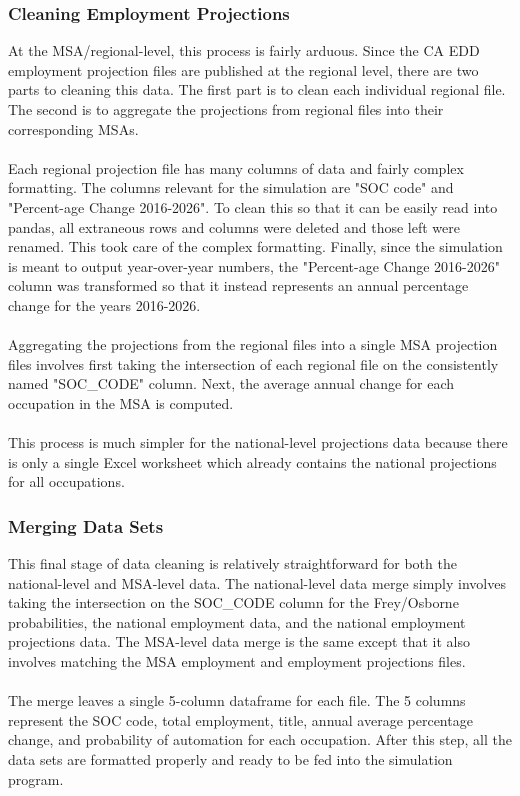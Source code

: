 \documentclass[10pt]{article}
\begin{document}
\subsubsection{Cleaning Employment Projections}
At the MSA/regional-level, this process is fairly arduous. Since the CA EDD employment projection files are published at the regional level, there are two parts to cleaning this data. The first part is to clean each individual regional file. The second is to aggregate the projections from regional files into their corresponding MSAs.\\\\ Each regional projection file has many columns of data and fairly complex formatting. The columns relevant for the simulation are "SOC code" and "Percent-age Change 2016-2026". To clean this so that it can be easily read into pandas, all extraneous rows and columns were deleted and those left were renamed. This took care of the complex formatting. Finally, since the simulation is meant to output year-over-year numbers, the "Percent-age Change 2016-2026" column was transformed so that it instead represents an annual percentage change for the years 2016-2026.\\\\ Aggregating the projections from the regional files into a single MSA projection files involves first taking the intersection of each regional file on the consistently named "SOC\_CODE" column. Next, the average annual change for each occupation in the MSA is computed.\\\\ This process is much simpler for the national-level projections data because there is only a single Excel worksheet which already contains the national projections for all occupations.

\subsubsection{Merging Data Sets}
This final stage of data cleaning is relatively straightforward for both the national-level and MSA-level data. The national-level data merge simply involves taking the intersection on the SOC\_CODE column for the Frey/Osborne probabilities, the national employment data, and the national employment projections data. The MSA-level data merge is the same except that it also involves matching the MSA employment and employment projections files.\\\\ The merge leaves a single 5-column dataframe for each file. The 5 columns represent the SOC code, total employment, title, annual average percentage change, and probability of automation for each occupation. After this step, all the data sets are formatted properly and ready to be fed into the simulation program.
\end{document}
